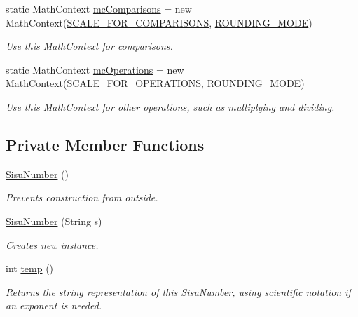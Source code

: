 \begin{DoxyCompactItemize}
static Math\+Context \hyperlink{classcom_1_1aarrelaakso_1_1drawl_1_1_sisu_number_a09a6e4440f1be870727ad0bc028fc237}{mc\+Comparisons} = new Math\+Context(\hyperlink{classcom_1_1aarrelaakso_1_1drawl_1_1_sisu_number_a9355f25a360283c24625dbdf2a397a0c}{S\+C\+A\+L\+E\+\_\+\+F\+O\+R\+\_\+\+C\+O\+M\+P\+A\+R\+I\+S\+O\+NS}, \hyperlink{classcom_1_1aarrelaakso_1_1drawl_1_1_sisu_number_a98077c422e928740febf571e3f2ec6b5}{R\+O\+U\+N\+D\+I\+N\+G\+\_\+\+M\+O\+DE})
\begin{DoxyCompactList}\small\item\em Use this Math\+Context for comparisons. \end{DoxyCompactList}\item 
static Math\+Context \hyperlink{classcom_1_1aarrelaakso_1_1drawl_1_1_sisu_number_a526b69c7921d715b6b49ad98ecf442fc}{mc\+Operations} = new Math\+Context(\hyperlink{classcom_1_1aarrelaakso_1_1drawl_1_1_sisu_number_ac514e84eda80c3673b5006716984670a}{S\+C\+A\+L\+E\+\_\+\+F\+O\+R\+\_\+\+O\+P\+E\+R\+A\+T\+I\+O\+NS}, \hyperlink{classcom_1_1aarrelaakso_1_1drawl_1_1_sisu_number_a98077c422e928740febf571e3f2ec6b5}{R\+O\+U\+N\+D\+I\+N\+G\+\_\+\+M\+O\+DE})
\begin{DoxyCompactList}\small\item\em Use this Math\+Context for other operations, such as multiplying and dividing. \end{DoxyCompactList}\end{DoxyCompactItemize}
\subsection*{Private Member Functions}
\begin{DoxyCompactItemize}
\item 
\hyperlink{classcom_1_1aarrelaakso_1_1drawl_1_1_sisu_number_a3e7b40170c4ae69461b94208a0f82f5e}{Sisu\+Number} ()
\begin{DoxyCompactList}\small\item\em Prevents construction from outside. \end{DoxyCompactList}\item 
\hyperlink{classcom_1_1aarrelaakso_1_1drawl_1_1_sisu_number_ae4e26788dba520fc76d449ea782810fc}{Sisu\+Number} (String s)
\begin{DoxyCompactList}\small\item\em Creates new instance. \end{DoxyCompactList}\item 
int \hyperlink{classcom_1_1aarrelaakso_1_1drawl_1_1_sisu_number_a846e0834c619e63a8d85579484ab4276}{temp} ()
\begin{DoxyCompactList}\small\item\em Returns the string representation of this \hyperlink{classcom_1_1aarrelaakso_1_1drawl_1_1_sisu_number}{Sisu\+Number}, using scientific notation if an exponent is needed. \end{DoxyCompactList}\end{DoxyCompactItemize}

